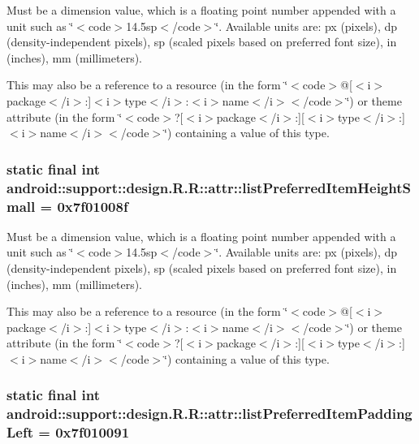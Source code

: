 Must be a dimension value, which is a floating point number appended with a unit such as \char`\"{}$<$code$>$14.5sp$<$/code$>$\char`\"{}. Available units are: px (pixels), dp (density-independent pixels), sp (scaled pixels based on preferred font size), in (inches), mm (millimeters). 

This may also be a reference to a resource (in the form \char`\"{}$<$code$>$@\mbox{[}$<$i$>$package$<$/i$>$:\mbox{]}$<$i$>$type$<$/i$>$:$<$i$>$name$<$/i$>$$<$/code$>$\char`\"{}) or theme attribute (in the form \char`\"{}$<$code$>$?\mbox{[}$<$i$>$package$<$/i$>$:\mbox{]}\mbox{[}$<$i$>$type$<$/i$>$:\mbox{]}$<$i$>$name$<$/i$>$$<$/code$>$\char`\"{}) containing a value of this type. \hypertarget{classandroid_1_1support_1_1design_1_1_r_1_1attr_cbadb64a97d419ca4ead892d242c31d2}{
\subsubsection[{listPreferredItemHeightSmall}]{\setlength{\rightskip}{0pt plus 5cm}static final int android::support::design.R.R::attr::listPreferredItemHeightSmall = 0x7f01008f}}
\label{classandroid_1_1support_1_1design_1_1_r_1_1attr_cbadb64a97d419ca4ead892d242c31d2}


Must be a dimension value, which is a floating point number appended with a unit such as \char`\"{}$<$code$>$14.5sp$<$/code$>$\char`\"{}. Available units are: px (pixels), dp (density-independent pixels), sp (scaled pixels based on preferred font size), in (inches), mm (millimeters). 

This may also be a reference to a resource (in the form \char`\"{}$<$code$>$@\mbox{[}$<$i$>$package$<$/i$>$:\mbox{]}$<$i$>$type$<$/i$>$:$<$i$>$name$<$/i$>$$<$/code$>$\char`\"{}) or theme attribute (in the form \char`\"{}$<$code$>$?\mbox{[}$<$i$>$package$<$/i$>$:\mbox{]}\mbox{[}$<$i$>$type$<$/i$>$:\mbox{]}$<$i$>$name$<$/i$>$$<$/code$>$\char`\"{}) containing a value of this type. \hypertarget{classandroid_1_1support_1_1design_1_1_r_1_1attr_cc17d95a55f76314e693fac2bd65ecfc}{
\subsubsection[{listPreferredItemPaddingLeft}]{\setlength{\rightskip}{0pt plus 5cm}static final int android::support::design.R.R::attr::listPreferredItemPaddingLeft = 0x7f010091}}
\label{classandroid_1_1support_1_1design_1_1_r_1_1attr_cc17d95a55f76314e693fac2bd65ecfc}


